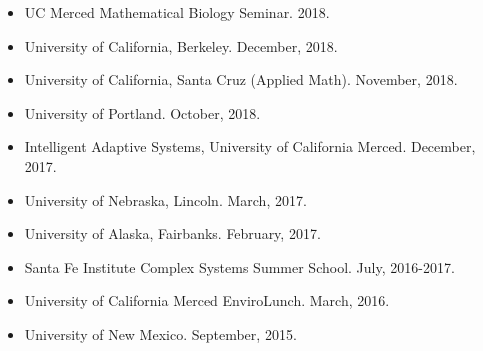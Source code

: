 \documentclass[margin,line,12pt]{res}
\begin{document}
\begin{resume}
\begin{itemize}
\item UC Merced Mathematical Biology Seminar. 2018.

\item University of California, Berkeley. December, 2018.

\item University of California, Santa Cruz (Applied Math). November, 2018.

\item University of Portland. October, 2018.

\item Intelligent Adaptive Systems, University of California Merced. December, 2017.

\item University of Nebraska, Lincoln. March, 2017.

\item University of Alaska, Fairbanks. February, 2017.

\item Santa Fe Institute Complex Systems Summer School. July, 2016-2017.

\item University of California Merced EnviroLunch. March, 2016.

\item University of New Mexico. September, 2015.


\end{itemize}
\end{resume}
\end{document}
